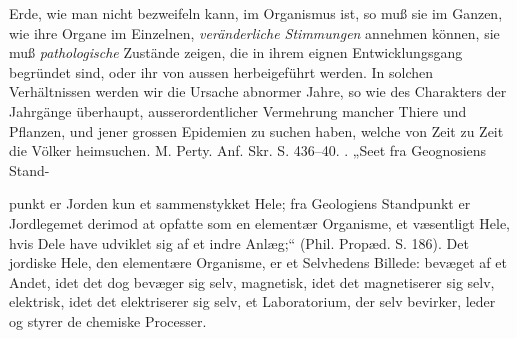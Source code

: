 \documentclass[12pt,a4paper]{book}
\begin{document}
{Erde, wie man nicht bezweifeln kann, im Organismus ist, so muß sie im
Ganzen, wie ihre Organe im Einzelnen, \emph{veränderliche Stimmungen}
annehmen können, sie muß \emph{pathologische} Zustände zeigen, die in
ihrem eignen Entwicklungsgang begründet sind, oder ihr von aussen
herbeigeführt werden. In solchen Verhältnissen werden wir die Ursache
abnormer Jahre, so wie des Charakters der Jahrgänge überhaupt,
ausserordentlicher Vermehrung mancher Thiere und Pflanzen, und jener
grossen Epidemien zu suchen haben, welche von Zeit zu Zeit die Völker
heimsuchen. M. Perty. Anf. Skr. S. 436--40.
}. „Seet fra Geognosiens Stand-

punkt er Jorden kun et sammenstykket Hele; fra Geologiens
Standpunkt er Jordlegemet derimod at opfatte som en elementær
Organisme, et væsentligt Hele, hvis Dele have udviklet sig af et
indre Anlæg;“ (Phil. Propæd. S. 186). Det jordiske Hele, den
elementære Organisme, er et Selvhedens Billede: bevæget af et
Andet, idet det dog bevæger sig selv, magnetisk, idet det
magnetiserer sig selv, elektrisk, idet det elektriserer sig selv, et
Laboratorium, der selv bevirker, leder og styrer de chemiske
Processer.
\end{document}
